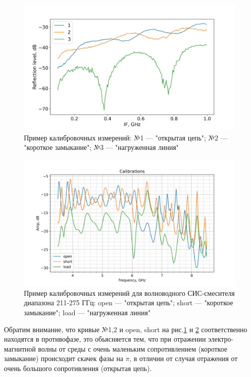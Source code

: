 \documentclass[a4paper]{article}
\begin{document}
\begin{figure}[H]
    \begin{center}
        \includegraphics[scale=0.5]{cals.png}
        \caption{Пример калибровочных измерений: №1 — "открытая цепь"; №2 — "короткое замыкание"; №3 — "нагруженная линия"}
        \label{pic-cals}
    \end{center}
\end{figure}

\begin{figure}[H]
    \begin{center}
        \includegraphics[scale=0.5]{cals2.png}
        \caption{Пример калибровочных измерений для волноводного СИС-смесителя диапазона 211-275 ГГц: open — "открытая цепь"; short — "короткое замыкание"; load — "нагруженная линия"}
        \label{pic-cals2}
    \end{center}
\end{figure}

Обратим внимание, что кривые №1,2 и open, short на рис.\ref{pic-cals} и \ref{pic-cals2} соответственно находятся в противофазе, это обьясняется тем, что при отражении электро-магнитной волны от среды с очень маленьким сопротивлением (короткое замыкание) происходит скачек фазы на $\pi$, в отличии от случая отражения от очень большого сопротивления (открытая цепь).
\end{document}
